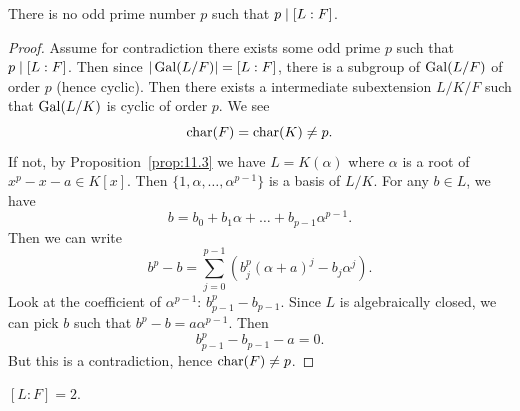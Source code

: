 \begin{claim}
There is no odd prime number $p$ such that $p\mid[L:F]$.
\end{claim}

\begin{proof}
Assume for contradiction there exists some odd prime $p$ such that
$p\mid[L:F]$. Then since $|\operatorname{Gal}(L/F)|=[L:F]$, there is a subgroup
of $\operatorname{Gal}(L/F)$ of order $p$ (hence cyclic). Then there exists a
intermediate subextension $L/K/F$ such that $\operatorname{Gal}(L/K)$ is cyclic of
order $p$. We see
\begin{equation}
\operatorname{char}(F)=\operatorname{char}(K)\neq p.
\end{equation}
If not, by Proposition~\ref{prop:11.3} we have $L=K(\alpha)$ where
$\alpha$ is a root of $x^{p}-x-a\in K[x]$. Then
$\{1,\alpha,\dots,\alpha^{p-1}\}$ is a basis of $L/K$. For any $b\in
L$, we have
\begin{equation}
b=b_{0}+b_{1}\alpha+\dots+b_{p-1}\alpha^{p-1}.
\end{equation}
Then we can write
\begin{equation}
b^{p}-b=\sum^{p-1}_{j=0}(b^{p}_{j}(\alpha+a)^{j}-b_{j}\alpha^{j}).
\end{equation}
Look at the coefficient of $\alpha^{p-1}$: $b^{p}_{p-1}-b_{p-1}$.
Since $L$ is algebraically closed, we can pick $b$ such that
$b^{p}-b=a\alpha^{p-1}$. Then
\begin{equation}
b^{p}_{p-1}-b_{p-1}-a=0.
\end{equation}
But this is a contradiction, hence $\operatorname{char}(F)\neq p$.
\end{proof}

\begin{claim}
$[L:F]=2$.
\end{claim}

